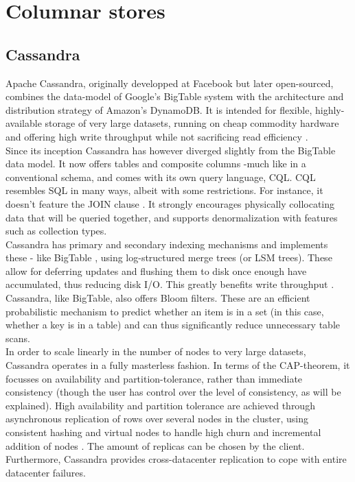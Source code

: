 \documentclass{IEEEtran}
\begin{document}
\section{Columnar stores}
\subsection{Cassandra}

Apache Cassandra, originally developped at Facebook but later open-sourced, combines the data-model of Google's BigTable system with the architecture and distribution strategy of Amazon's DynamoDB. It is intended for flexible, highly-available storage of very large datasets, running on cheap commodity hardware and offering high write throughput while not sacrificing read efficiency \cite{lakshman2010cassandra}.
\\
Since its inception Cassandra has however diverged slightly from the BigTable data model. It now offers tables and composite columns -much like in a conventional schema, and comes with its own query language, CQL\cite{cassandra_then&now}. CQL resembles SQL in many ways, albeit with some restrictions. For instance, it doesn't feature the JOIN clause \cite{cassandra_cql}. It strongly encourages physically collocating data that will be queried together, and supports denormalization with features such as collection types.\\
Cassandra has primary and secondary indexing mechanisms and implements these - like BigTable \cite{chang2008bigtable}, using log-structured merge trees (or LSM trees). These allow for deferring updates and flushing them to disk once enough have accumulated, thus reducing disk I/O. This greatly benefits write throughput \cite{o1996log}\cite{sears2012blsm}\cite{lakshman2010cassandra}. Cassandra, like BigTable, also offers Bloom filters\cite{mullin1983second}. These are an efficient probabilistic mechanism to predict whether an item is in a set (in this case, whether a key is in a table) and can thus significantly reduce unnecessary table scans\cite{lakshman2010cassandra}.\\
In order to scale linearly in the number of nodes to very large datasets, Cassandra operates in a fully masterless fashion. In terms of the CAP-theorem, it focusses on availability and partition-tolerance, rather than immediate consistency (though the user has control over the level of consistency, as will be explained). High availability and partition tolerance are achieved through asynchronous replication of rows over several nodes in the cluster, using consistent hashing and virtual nodes to handle high churn and incremental addition of nodes \cite{decandia2007dynamo} \cite{lakshman2010cassandra} \cite{cassandra_then&now}. The amount of replicas can be chosen by the client. Furthermore, Cassandra provides cross-datacenter replication to cope with entire datacenter failures.
\end{document}
